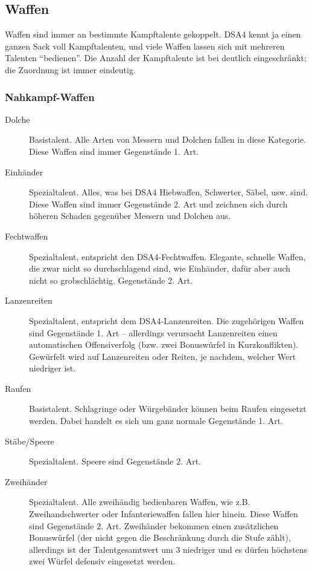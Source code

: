 \subsection{Waffen}
Waffen sind immer an bestimmte Kampftalente gekoppelt. DSA4 kennt ja einen ganzen Sack voll Kampftalenten, und viele Waffen lassen sich mit mehreren Talenten ``bedienen''. Die Anzahl der Kampftalente ist bei \StoryDSA deutlich eingeschränkt; die Zuordnung ist immer eindeutig.

\subsubsection{Nahkampf-Waffen}
\begin{description}
\item[Dolche] Basistalent. Alle Arten von Messern und Dolchen fallen in diese Kategorie. Diese Waffen sind immer Gegenstände 1. Art.
\item[Einhänder] Spezialtalent. Alles, was bei DSA4 Hiebwaffen, Schwerter, Säbel, usw. sind. Diese Waffen sind immer Gegenstände 2. Art und zeichnen sich durch höheren Schaden gegenüber Messern und Dolchen aus.
\item[Fechtwaffen] Spezialtalent, entspricht den DSA4-Fechtwaffen. Elegante, schnelle Waffen, die zwar nicht so durchschlagend sind, wie Einhänder, dafür aber auch nicht so grobschlächtig. Gegenstände 2. Art.
\item[Lanzenreiten] Spezialtalent, entspricht dem DSA4-Lanzenreiten. Die zugehörigen Waffen sind Gegenstände 1. Art -- allerdings verursacht Lanzenreiten einen automatischen Offensiverfolg (bzw. zwei Bonuswürfel in Kurzkonflikten). Gewürfelt wird auf Lanzenreiten oder Reiten, je nachdem, welcher Wert niedriger ist.
\item[Raufen] Basistalent. Schlagringe oder Würgebänder können beim Raufen eingesetzt werden. Dabei handelt es sich um ganz normale Gegenstände 1. Art.
\item[Stäbe/Speere] Spezialtalent. Speere sind Gegenstände 2. Art.
\item[Zweihänder] Spezialtalent. Alle zweihändig bedienbaren Waffen, wie z.B. Zweihandschwerter oder Infanteriewaffen fallen hier hinein. Diese Waffen sind Gegenstände 2. Art. Zweihänder bekommen einen zusätzlichen Bonuswürfel (der nicht gegen die Beschränkung durch die Stufe zählt), allerdings ist der Talentgesamtwert um 3 niedriger und es dürfen höchstens zwei Würfel defensiv eingesetzt werden.
\end{description}


